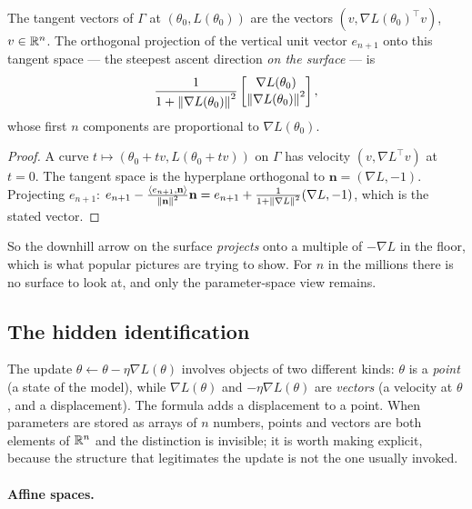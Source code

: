 \begin{notechapter}
\begin{proposition}\label{gradient-tangent-space:prop:graph}
The tangent vectors of $\Gamma$ at $(\theta_0, L(\theta_0))$ are the vectors $(v, \nabla L(\theta_0)^\top v)$, $v\in\mathbb{R}^n$. The
orthogonal projection of the vertical unit vector $e_{n+1}$ onto this tangent space --- the steepest
ascent direction \emph{on the surface} --- is
\[
  \frac1{1 + \left\|\nabla L(\theta_0)\right\|^2}\begin{bmatrix}\nabla L(\theta_0)\\ \left\|\nabla L(\theta_0)\right\|^2\end{bmatrix},
\]
whose first $n$ components are proportional to $\nabla L(\theta_0)$.
\end{proposition}

\begin{proof}
A curve $t\mapsto(\theta_0 + tv, L(\theta_0 + tv))$ on $\Gamma$ has velocity $(v, \nabla L^\top v)$ at $t = 0$. The tangent
space is the hyperplane orthogonal to $\mathbf n = (\nabla L, -1)$. Projecting $e_{n+1}$:
$e_{n+1} - \frac{\left\langle e_{n+1}, \mathbf n \right\rangle}{\left\|\mathbf n\right\|^2}\mathbf n = e_{n+1} + \frac{1}{1 + \left\|\nabla L\right\|^2}(\nabla L, -1)$, which is the stated
vector.
\end{proof}

So the downhill arrow on the surface \emph{projects} onto a multiple of $-\nabla L$ in the floor, which is
what popular pictures are trying to show. For $n$ in the millions there is no surface to look at,
and only the parameter-space view remains.

\subsection{The hidden identification}\label{gradient-tangent-space:sec:affine}

The update $\theta\leftarrow\theta - \eta\nabla L(\theta)$ involves objects of two different kinds: $\theta$ is a
\emph{point} (a state of the model), while $\nabla L(\theta)$ and $-\eta\nabla L(\theta)$ are \emph{vectors} (a velocity at
$\theta$, and a displacement). The formula adds a displacement to a point. When parameters are
stored as arrays of $n$ numbers, points and vectors are both elements of $\mathbb{R}^n$ and the
distinction is invisible; it is worth making explicit, because the structure that legitimates
the update is not the one usually invoked.

\paragraph{Affine spaces.}


\end{notechapter}
